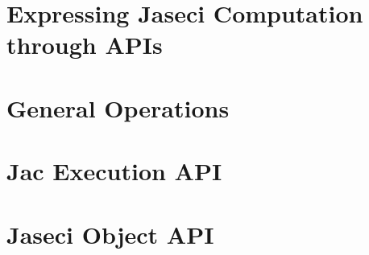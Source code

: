 \chapter{Expressing Jaseci Computation through APIs}
\chapter{General Operations}
\chapter{Jac Execution API}
\chapter{Jaseci Object API}